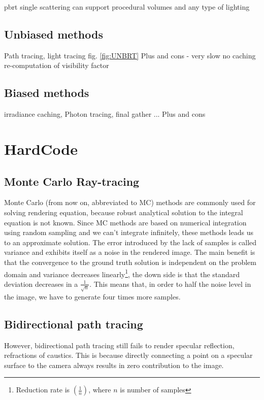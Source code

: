 pbrt single scattering
can support procedural volumes and any type of lighting

\subsection{Unbiased methods}


Path tracing, light tracing fig. \ref{fig:UNBRT}
Plus and cons - very slow no caching re-computation of visibility factor

\subsection{Biased methods}

\cite{jarosz08thesis} %
irradiance caching, Photon tracing, final gather ...
Plus and cons

\section{HardCode}
\subsection{Monte Carlo Ray-tracing}
Monte Carlo (from now on, abbreviated to MC) methods are commonly used for solving rendering equation, because robust analytical solution to the integral equation is not known. Since MC methods are based on numerical integration using random sampling and we can't integrate infinitely, these methods leads us to an approximate solution. The error introduced by the lack of samples is called variance and exhibits itself as a noise in the rendered image. The main benefit is that the convergence to the ground truth solution is independent on the problem domain and variance decreases linearly\footnote{Reduction rate is $(\frac{1}{n})$, where $n$ is number of samples}, the down side is that the standard deviation decreases in a $\frac{1}{\sqrt{n}}$. This means that, in order to half the noise level in the image, we have to generate four times more samples.

\subsection{Bidirectional path tracing}
However, bidirectional path tracing still fails to render specular reflection, refractions of caustics. This is because directly connecting a point on a specular surface to the camera always results in zero contribution to the image.


